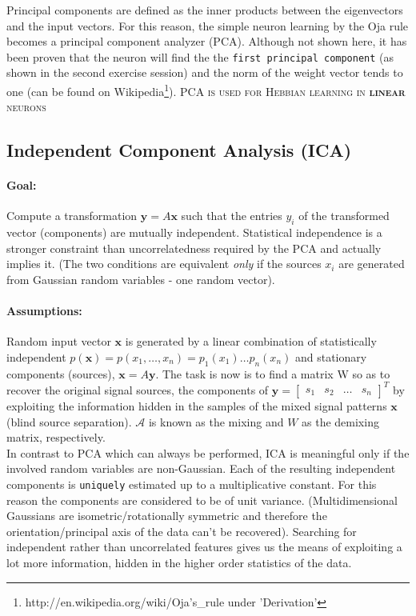 \documentclass[11pt]{article}
\begin{document}
Principal components are defined as the inner products between the eigenvectors and the input vectors. For this reason, the simple neuron learning by the Oja rule becomes a principal component analyzer (PCA).
Although not shown here, it has been proven that the neuron will find the the \texttt{first principal component} (as shown in the second exercise session) and the norm of the weight vector tends to one (can be found on Wikipedia\footnote{http://en.wikipedia.org/wiki/Oja's\_rule under 'Derivation'}).
\textsc{PCA is used for Hebbian learning in \textbf{linear} neurons}

\subsection{Independent Component Analysis (ICA)}

\paragraph{Goal:} Compute a transformation $\mathbf{y}=A\mathbf{x}$ such that the entries $y_i$ of the transformed vector (components) are mutually independent. Statistical independence is a stronger constraint than uncorrelatedness required by the PCA and actually implies it. (The two conditions are equivalent \textit{only} if the sources $x_i$ are generated from Gaussian random variables - one random vector). 

\paragraph{Assumptions:} Random input vector $\mathbf{x}$ is generated by a linear combination of statistically independent $p(\mathbf{x})=p(x_1,\dots,x_n)=p_1(x_1)\dots p_n(x_n)$ and stationary components (sources), $\mathbf{x}=A\mathbf{y}$. The task is now is to find a matrix W so as to recover the original signal sources, the components of $\mathbf{y}=\begin{bmatrix}s_1 & s_2 & \dots & s_n\end{bmatrix}^T$ by exploiting the information hidden in the samples of the mixed signal patterns $\mathbf{x}$ (blind source separation). $\mathcal{A}$ is known as the mixing and $W$ as the demixing matrix, respectively.\\
In contrast to PCA which can always be performed, ICA is meaningful only if the involved random variables are non-Gaussian. Each of the resulting independent components is \texttt{uniquely} estimated up to a multiplicative constant. For this reason the components are considered to be of unit variance. (Multidimensional Gaussians are isometric/rotationally symmetric and therefore the orientation/principal axis of the data can't be recovered). %
Searching for independent rather than uncorrelated features gives us the means of exploiting a lot more information, hidden in the higher order statistics of the data.
\end{document}
